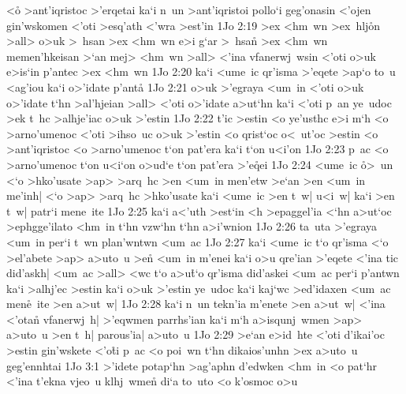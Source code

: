 <o\r{}
>ant'iqristoc
>'erqetai
ka`i
n~un
>ant'iqristoi
pollo`i
geg'onasin
<'ojen
gin'wskomen
<'oti
>esq'ath
<'wra
>est'in\bibvsend
\vs 1Jo 2:19
>ex
<hm~wn
>ex~hlj\r{o}n
>all>
o>uk
>~hsan
>ex
<hm~wn
e>i
g`ar
>~hsan\r{}
>ex
<hm~wn
memen'hkeisan
>`an
mej>
<hm~wn
>all>
<'ina
vfanerwj~wsin
<'oti
o>uk
e>is`in
p'antec
>ex
<hm~wn\bibvsend
\vs 1Jo 2:20
ka`i
<ume~ic
qr'isma
>'eqete
>ap`o
to~u
<ag'iou
ka`i
o>'idate
p'ant\r{a}\bibvsend
{}
\vs 1Jo 2:21
o>uk
>'egraya
<um~in
<'oti
o>uk
o>'idate
t`hn
>al'hjeian
>all>
<'oti
o>'idate
a>ut`hn
ka`i
<'oti
p~an
ye~udoc
>ek
t~hc
>alhje'iac
o>uk
>'estin\bibvsend
\vs 1Jo 2:22
t'ic
>estin
<o
ye'usthc
e>i
m`h
<o
>arno'umenoc
<'oti
>ihso~uc
o>uk
>'estin
<o
qrist`oc
o<~ut'oc
>estin
<o
>ant'iqristoc
<o
>arno'umenoc
t`on
pat'era
ka`i
t`on
u<i'on\bibvsend
\vs 1Jo 2:23
p~ac
<o
>arno'umenoc
t`on
u<i`on
o>ud`e
t`on
pat'era
>'e\r{q}ei\bibvsend
{}
\vs 1Jo 2:24
<ume~ic
\r{o}>~un
<`o
>hko'usate
>ap>
>arq~hc
>en
<um~in
men'etw
>e`an
>en
<um~in
me'inh|
<`o
>ap>
>arq~hc
>hko'usate
ka`i
<ume~ic
>en
t~w|
u<i~w|
ka`i
>en
t~w|
patr`i
mene~ite\bibvsend
\vs 1Jo 2:25
ka`i
a<'uth
>est`in
<h
>epaggel'ia
<`hn
a>ut`oc
>ephgge'ilato
<hm~in
t`hn
vzw`hn
t`hn
a>i'wnion\bibvsend
\vs 1Jo 2:26
ta~uta
>'egraya
<um~in
per`i
t~wn
plan'wntwn
<um~ac\bibvsend
\vs 1Jo 2:27
ka`i
<ume~ic
t`o
qr'isma
<`o
>el'abete
>ap>
a>uto~u
>en\r{}
<um~in
m'enei
ka`i
o>u
qre'ian
>'eqete
<'ina
tic
did'askh|
<um~ac
>all>
<wc
t`o
a>u\r{t}`o
qr'isma
did'askei
<um~ac
per`i
p'antwn
ka`i
>alhj'ec
>estin
ka`i
o>uk
>'estin
ye~udoc
ka`i
kaj`wc
>ed'idaxen
<um~ac
men\r{e}~ite
>en
a>ut~w|\bibvsend
\vs 1Jo 2:28
ka`i
n~un
tekn'ia
m'enete
>en
a>ut~w|
<'ina
<'otan\r{}
vfanerwj~h|
>'eqwmen
parrhs'ian
ka`i
m`h
a>isqunj~wmen
>ap>
a>uto~u
>en
t~h|
parous'ia|
a>uto~u\bibvsend
\vs 1Jo 2:29
>e`an
e>id~hte
<'oti
d'ikai'oc
>estin
gin'wskete
<'o\r{t}i
p~ac
<o
poi~wn
t`hn
dikaios'unhn
>ex
a>uto~u
geg'ennhtai\bibvsend
\vs 1Jo 3:1
>'idete
potap`hn
>ag'aphn
d'edwken
<hm~in
<o
pat`hr
<'ina
t'ekna
vjeo~u
klhj~wme\r{n}
di`a
to~uto
<o
k'osmoc
o>u

